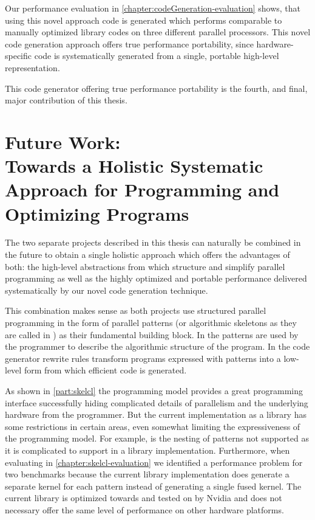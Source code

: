 Our performance evaluation in \autoref{chapter:codeGeneration-evaluation} shows, that using this novel approach \OpenCL code is generated which performs comparable to manually optimized library codes on three different parallel processors.
This novel code generation approach offers true performance portability, since hardware-specific code is systematically generated from a single, portable high-level representation.

\bigskip
This code generator offering true performance portability is the fourth, and final, major contribution of this thesis.


\section[Future Work]{Future Work:\\ Towards a Holistic Systematic Approach for Programming and Optimizing Programs}
\label{section:future-work}
The two separate projects described in this thesis can naturally be combined in the future to obtain a single holistic approach which offers the advantages of both:
the high-level abstractions from \SkelCL which structure and simplify parallel programming as well as the highly optimized and portable performance delivered systematically by our novel code generation technique.

This combination makes sense as both projects use structured parallel programming in the form of parallel patterns (or algorithmic skeletons as they are called in \SkelCL) as their fundamental building block.
In \SkelCL the patterns are used by the programmer to describe the algorithmic structure of the program.
In the code generator rewrite rules transform programs expressed with patterns into a low-level form from which efficient \OpenCL code is generated.

As shown in \autoref{part:skelcl} the \SkelCL programming model provides a great programming interface successfully hiding complicated details of parallelism and the underlying hardware from the programmer.
But the current implementation as a \Cpp library has some restrictions in certain areas, even somewhat limiting the expressiveness of the programming model.
For example, is the nesting of patterns not supported as it is complicated to support in a library implementation.
Furthermore, when evaluating \SkelCL in \autoref{chapter:skelcl-evaluation} we identified a performance problem for two benchmarks because the current \SkelCL library implementation does generate a separate \OpenCL kernel for each pattern instead of generating a single fused kernel.
The current library is optimized towards and tested on \GPUs by Nvidia and does not necessary offer the same level of performance on other hardware platforms.

